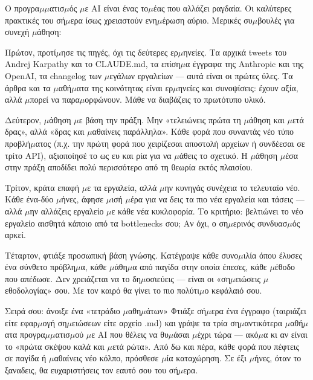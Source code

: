 
Ο προγρα$\mu$$\mu$ατισ$\mu$ός $\mu$ε AI είναι ένας το$\mu$έας που αλλάζει ραγδαία. Οι καλύτερες πρακτικές του σή$\mu$ερα ίσως χρειαστούν ενη$\mu$έρωση αύριο. Μερικές συ$\mu$βουλές για συνεχή $\mu$άθηση:

Πρώτον, προτί$\mu$ησε τις πηγές, όχι τις δεύτερες ερ$\mu$ηνείες. Τα αρχικά tweets του Andrej Karpathy και το CLAUDE.md, τα επίση$\mu$α έγγραφα της Anthropic και της OpenAI, τα changelog των $\mu$εγάλων εργαλείων — αυτά είναι οι πρώτες ύλες. Τα άρθρα και τα $\mu$αθή$\mu$ατα της κοινότητας είναι ερ$\mu$ηνείες και συνοψίσεις: έχουν αξία, αλλά $\mu$πορεί να παρα$\mu$ορφώνουν. Μάθε να διαβάζεις το πρωτότυπο υλικό.

Δεύτερον, $\mu$άθηση $\mu$ε βάση την πράξη. Μην «τελειώνεις πρώτα τη $\mu$άθηση και $\mu$ετά δρας», αλλά «δρας και $\mu$αθαίνεις παράλληλα». Κάθε φορά που συναντάς νέο τύπο προβλή$\mu$ατος (π.χ. την πρώτη φορά που χειρίζεσαι αποστολή αρχείων ή συνδέεσαι σε τρίτο API), αξιοποίησέ το ως ευ και ρία για να $\mu$άθεις το σχετικό. Η $\mu$άθηση $\mu$έσα στην πράξη αποδίδει πολύ περισσότερο από τη θεωρία εκτός πλαισίου.

Τρίτον, κράτα επαφή $\mu$ε τα εργαλεία, αλλά $\mu$ην κυνηγάς συνέχεια το τελευταίο νέο. Κάθε ένα-δύο $\mu$ήνες, άφησε $\mu$ισή $\mu$έρα για να δεις τα πιο νέα εργαλεία και τάσεις — αλλά $\mu$ην αλλάζεις εργαλείο $\mu$ε κάθε νέα κυκλοφορία. Το κριτήριο: βελτιώνει το νέο εργαλείο αισθητά κάποιο από τα bottlenecks σου; Αν όχι, ο ση$\mu$ερινός συνδυασ$\mu$ός αρκεί.

Τέταρτον, φτιάξε προσωπική βάση γνώσης. Κατέγραψε κάθε συνο$\mu$ιλία όπου έλυσες ένα σύνθετο πρόβλη$\mu$α, κάθε $\mu$άθη$\mu$α από παγίδα στην οποία έπεσες, κάθε $\mu$έθοδο που απέδωσε. Δεν χρειάζεται να το δη$\mu$οσιεύεις — είναι οι «ση$\mu$ειώσεις $\mu$εθοδολογίας» σου. Με τον καιρό θα γίνει το πιο πολύτι$\mu$ο κεφάλαιό σου.

\begin{tcbpractice}{Σειρά σου: άνοιξε ένα «τετράδιο $\mu$αθη$\mu$άτων»}
Φτιάξε σή$\mu$ερα ένα έγγραφο (ταιριάζει είτε εφαρ$\mu$ογή ση$\mu$ειώσεων είτε αρχείο .md) και γράψε τα τρία ση$\mu$αντικότερα $\mu$αθή$\mu$ατα προγρα$\mu$$\mu$ατισ$\mu$ού $\mu$ε AI που θέλεις να θυ$\mu$άσαι $\mu$έχρι τώρα — ακό$\mu$α κι αν είναι το «πρώτα σκέψου καλά και $\mu$ετά ρώτα». Από δω και πέρα, κάθε φορά που πέφτεις σε παγίδα ή $\mu$αθαίνεις νέο κόλπο, πρόσθεσε $\mu$ία καταχώρηση. Σε έξι $\mu$ήνες, όταν το ξαναδεις, θα ευχαριστήσεις τον εαυτό σου του σή$\mu$ερα.

\end{tcbpractice}

